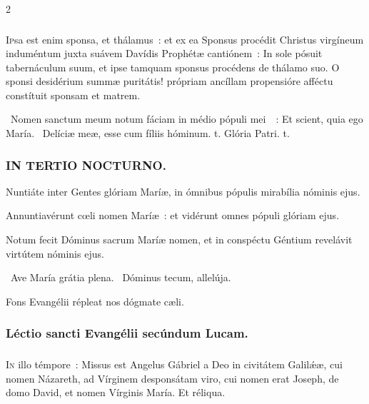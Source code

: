 \documentclass[9pt,twoside]{extarticle}
\begin{document}
\begin{multicols}{2}
{\subsubsection*{\center {}}
\lettrine{I}psa est enim sponsa, et thálamus~: et ex ea Sponsus procédit Christus virgíneum induméntum juxta suávem Davídis Prophétæ cantiónem~: In sole pósuit tabernáculum suum, et ipse tamquam sponsus procédens de thálamo suo. O sponsi desidérium summæ puritátis! própriam ancíllam propensióre afféctu constítuit sponsam et matrem.

\begin{tightlist}{}
\item {}~Nomen sanctum meum notum fáciam in médio pópuli mei~~: \textred{*} Et scient, quia ego María. ~Delíciæ meæ, esse cum fíliis hóminum. t. Glória Patri. t.
\end{tightlist}

\subsubsection*{\center \textsc{IN TERTIO NOCTURNO.}}
\begin{tightlist}{}
\item {} Nuntiáte inter Gentes glóriam Maríæ, in ómnibus pópulis mirabília nóminis ejus.
\item {} Annuntiavérunt cœli nomen Maríæ~: et vidérunt omnes pópuli glóriam ejus.
\item {} Notum fecit Dóminus sacrum Maríæ nomen, et in conspéctu Géntium revelávit virtútem nóminis ejus.
\item {}~Ave María grátia plena. ~Dóminus tecum, allelúja.
\item {\small {} Fons Evangélii répleat nos dógmate cæli.}
\end{tightlist}

\subsubsection*{\center Léctio sancti Evangélii secúndum Lucam.}
\subsubsection*{\center {}}
\lettrine{I}n illo témpore~: Missus est Angelus Gábriel a Deo in civitátem Galilǽæ, cui nomen Názareth, ad Vírginem desponsátam viro, cui nomen erat Joseph, de domo David, et nomen Vírginis María. Et réliqua.

}
\end{multicols}
\end{document}
